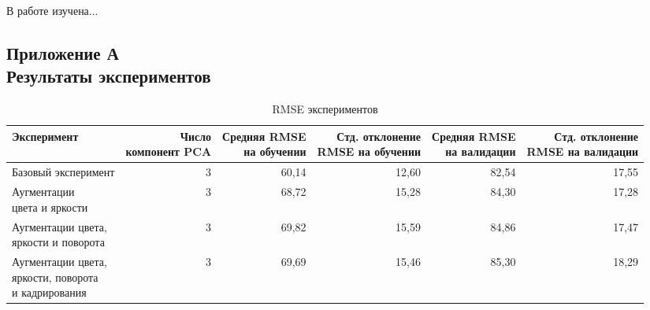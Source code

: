 \documentclass[a4paper,14pt]{article}
\begin{document}
    В работе изучена...
    
        \begin{landscape}
    	
    	\begin{flushright}
    		\section*{\normalsize \hfill Приложение А \\ \hfill Результаты экспериментов}
    	\end{flushright}
    	
    	\begin{table}[H]
    		\caption{RMSE экспериментов}
    		\label{tab:experiments_kpoints_rmse} 
\begin{tabular}{lrrrrr}
	\toprule
	Эксперимент &  \makecell{Число\\ компонент PCA }&  \makecell{Средняя RMSE\\ на обучении} &  \makecell{Стд. отклонение\\ RMSE на обучении} &  \makecell{Средняя RMSE\\ на валидации} &  \makecell{Стд. отклонение\\ RMSE на валидации} \\
	\midrule
	Базовый эксперимент &                    3 &                     60,14 &                             12,60 &                      82,54 &                              17,55 \\ \hline
	\makecell{Аугментации\\ цвета и яркости} &                    3 &                     68,72 &                             15,28 &                      84,30 &                              17,28 \\ \hline
	\makecell{Аугментации цвета,\\ яркости и поворота} &                    3 &                     69,82 &                             15,59 &                      84,86 &                              17,47  \\ \hline
	\makecell{Аугментации цвета,\\ яркости, поворота\\ и кадрирования}&                    3 &                     69,69 &                             15,46 &                      85,30 &                              18,29 \\ 
	\bottomrule
\end{tabular}
    	\end{table}
    \end{landscape}
\end{document}
